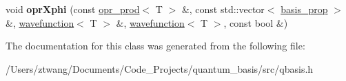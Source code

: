 \begin{DoxyCompactItemize}
\item 
\mbox{\label{classqbasis_1_1opr__prod_aaec0b4b8d0787d76e9e56aac52e4f346}} 
void {\bfseries opr\+Xphi} (const \hyperlink{classqbasis_1_1opr__prod}{opr\+\_\+prod}$<$ T $>$ \&, const std\+::vector$<$ \hyperlink{classqbasis_1_1basis__prop}{basis\+\_\+prop} $>$ \&, \hyperlink{classqbasis_1_1wavefunction}{wavefunction}$<$ T $>$ \&, \hyperlink{classqbasis_1_1wavefunction}{wavefunction}$<$ T $>$, const bool \&)
\end{DoxyCompactItemize}


The documentation for this class was generated from the following file\+:\begin{DoxyCompactItemize}
\item 
/\+Users/ztwang/\+Documents/\+Code\+\_\+\+Projects/quantum\+\_\+basis/src/qbasis.\+h\end{DoxyCompactItemize}
